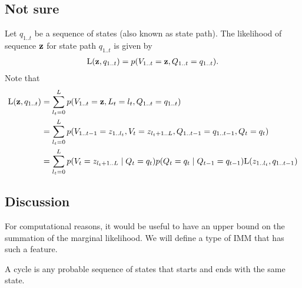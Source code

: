 \subsection{Not sure}

Let $q_{1..t}$ be a sequence of states (also known as state path).
The likelihood of sequence $\mathbf{z}$ for state path $q_{1..t}$ is given by
\begin{align*}
  \mathrm{L}(\mathbf{z}, q_{1..t}) = p(V_{1..t}=\mathbf{z}, Q_{1..t}=q_{1..t}).
\end{align*}
Note that
\begin{align*}
  \mathrm{L}(\mathbf{z}, q_{1..t}) &= \sum_{l_t=0}^L p(V_{1..t}=\mathbf{z}, L_t=l_t,
  Q_{1..t}=q_{1..t})\\
  &= \sum_{l_t=0}^L p(V_{1..t-1}=z_{1..l_t}, V_t=z_{l_t+1..L}, Q_{1..t-1}=q_{1..t-1}, Q_t=q_t)\\
  &= \sum_{l_t=0}^L p(V_t=z_{l_t+1..L} \;|\; Q_t=q_t) p(Q_t=q_t \;|\; Q_{t-1}=q_{t-1})
  \mathrm{L}(z_{1..l_t}, q_{1..t-1})
\end{align*}


\subsection{Discussion}

For computational reasons, it would be useful to have an upper bound on the summation of the
marginal likelihood.
We will define a type of IMM that has such a feature.

\begin{definition}
  A cycle is any probable sequence of states that starts and ends with the same state.
\end{definition}

